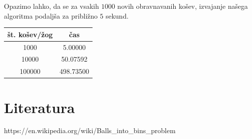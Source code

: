 \documentclass[a4paper, 11pt]{article}
\begin{document}
Opazimo lahko, da se za vsakih $1000$ novih obravnavanih košev, izvajanje našega algoritma podaljša za približno $5$ sekund. 

\begin{center}
    \begin{tabular}{|c|c|}
        \hline
        št. košev/žog & čas \\
        \hline
        1000 & 5.00000 \\
        \hline
        10000 & 50.07592 \\
        \hline
        100000 & 498.73500 \\
        \hline
    \end{tabular}
\end{center}

\pagebreak
\section{Literatura}

https://en.wikipedia.org/wiki/Balls\_into\_bins\_problem
\end{document}
